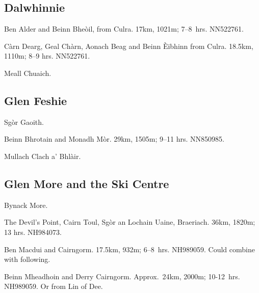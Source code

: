 
\subsection{Dalwhinnie}

\begin{munros}
\item \target Ben Alder and Beinn Bheòil, from Culra.  17km, 1021m;
  7--8~hrs. NN522761. \tick

\item \target Càrn Dearg, Geal Chàrn, Aonach Beag and Beinn Èibhinn from
  Culra.  18.5km, 1110m; 8--9 hrs.  NN522761.  \tick

\item
Meall Chuaich.  \tick
\end{munros}


\subsection{Glen Feshie}

\begin{munros}
\item Sgòr Gaoith.  \tick

\item \target Beinn Bhrotain and Monadh Mòr.  29km, 1505m; 9--11 hrs.
  NN850985.  \tick

\item Mullach Clach a' Bhlàir.
\end{munros}


\subsection{Glen More and the Ski Centre}

\begin{munros}
\item Bynack More.

\item\target The Devil's Point, Cairn Toul, Sgòr an Lochain Uaine, Braeriach.
  36km, 1820m; 13 hrs.  NH984073.  \tick

\item\target Ben Macdui and Cairngorm.  17.5km, 932m; 6--8~hrs.  NH989059.
  Could combine with following.  \tick

\item\target Beinn Mheadhoin and Derry Cairngorm.  Approx.\ 24km, 2000m;
  10-12~hrs. NH989059.  Or from Lin of Dee.  \tick
\end{munros}


